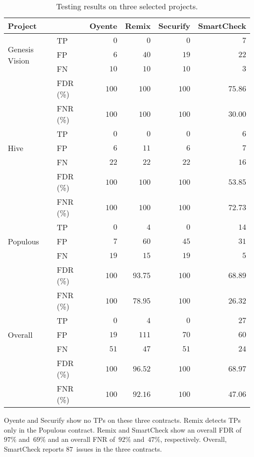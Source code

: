 \begin{table*}[t]
	\centering
	\caption{Testing results on three selected projects.}
	\begin{tabular}{|l|l|r|r|r|r|}
		\hline
		\textbf{Project} &  & \textbf{Oyente} & \textbf{Remix} & \textbf{Securify} & \textbf{SmartCheck} \\
		\hline
		\multirow{3}{*}{Genesis Vision}
			& TP & $0$ & $0$ & $0$ & $7$ \\
			& FP & $6$ & $40$ & $19$ & $22$ \\
			& FN & $10$ & $10$ & $10$ & $3$ \\
			& FDR (\%) & $100$ & $100$ & $100$ & $75.86$ \\
			& FNR (\%) & $100$ & $100$ & $100$ & $30.00$ \\
		\hline
		\multirow{3}{*}{Hive}
			& TP & $0$ & $0$ & $0$ & $6$ \\
			& FP & $6$ & $11$ & $6$ & $7$ \\
			& FN & $22$ & $22$ & $22$ & $16$ \\
			& FDR (\%) & $100$ & $100$ & $100$ & $53.85$ \\
			& FNR (\%) & $100$ & $100$ & $100$ & $72.73$ \\
		\hline
		\multirow{3}{*}{Populous}
			& TP & $0$ & $4$ & $0$ & $14$ \\
			& FP & $7$ & $60$ & $45$ & $31$ \\
			& FN & $19$ & $15$ & $19$ & $5$ \\
			& FDR (\%) & $100$ & $93.75$ & $100$ & $68.89$ \\
			& FNR (\%) & $100$ & $78.95$ & $100$ & $26.32$ \\
		\hline
		\multirow{3}{*}{Overall}
			& TP & $0$ & $4$ & $0$ & $27$ \\
			& FP & $19$ & $111$ & $70$ & $60$ \\
			& FN & $51$ & $47$ & $51$ & $24$ \\
			& FDR (\%) & $100$ & $96.52$ & $100$ & $68.97$ \\
			& FNR (\%) & $100$ & $92.16$ & $100$ & $47.06$ \\
		\hline
	\end{tabular}
	\label{CaseStudyTable}
\end{table*}

Oyente and Securify show no TPs on these three contracts.
Remix detects TPs only in the Populous contract.
Remix and SmartCheck show an overall FDR of~$97\%$ and~$69\%$ and an overall FNR of~$92\%$ and~$47\%$, respectively.
Overall, SmartCheck reports $87$~issues in the three contracts.

